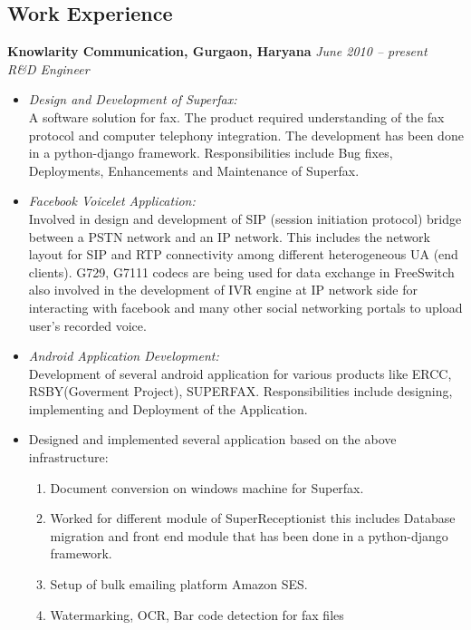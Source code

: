 \documentclass[margin,line]{resume}
\begin{document}
\begin{resume}
    \section{\mysidestyle Work Experience}

    \textbf{Knowlarity Communication, Gurgaon, Haryana}   \hfill \textsl{June 2010 -- present} \vspace{0mm}\\\vspace{0mm}%
           \textsl{R\&D Engineer} 
    \begin{itemize}
    
     \item \textsl{Design and Development of Superfax:} \\
      A software solution for fax. The product required understanding of the fax protocol and computer telephony integration.
      The development has been done in a python-django framework. Responsibilities include Bug fixes, Deployments, Enhancements and Maintenance of Superfax.
    
      \item \textsl{Facebook Voicelet Application:}\\
      Involved in design and development of SIP (session initiation protocol) bridge between a PSTN network and an IP network.
      This includes the network layout for SIP and RTP connectivity among different heterogeneous UA (end clients).
      G729, G7111 codecs are being used for data exchange in FreeSwitch also involved in the development of IVR engine 
      at IP network side for interacting with facebook and many other social networking portals to upload user's recorded voice.

     \item \textsl{Android Application Development:} \\
      Development of several android application for various products like ERCC, RSBY(Goverment Project), SUPERFAX.
      Responsibilities include designing, implementing and Deployment of the Application.
     \item Designed and implemented several application based on the above infrastructure:
        \begin{enumerate}
         \item Document conversion on windows machine for Superfax.
         \item Worked for different module of SuperReceptionist this includes Database migration and front end module that has been done in a python-django framework.   
         \item Setup of bulk emailing platform Amazon SES.
	 \item Watermarking, OCR, Bar code detection for fax files
        \end{enumerate}
    \end{itemize}


\end{resume}
\end{document}

